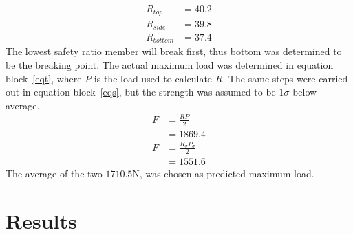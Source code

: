 \documentclass[12pt]{article}
\begin{document}
		\begin{subequations}
			\begin{align}
				R_{top}&=40.2\\
				R_{side}&=39.8\\
				R_{bottom}&=37.4
			\end{align}
			\label{eqrl}
		\end{subequations}
		The lowest safety ratio member will break first, thus bottom was determined to be the breaking point. The actual maximum load was determined in equation block~\ref{eqt}, where $P$ is the load used to calculate $R$. The same steps were carried out in equation block~\ref{eqs}, but the strength was assumed to be $1\sigma$ below average.
		\begin{subequations}
			\begin{align}
				F&=\frac{R P}{2} \\
				&=1869.4
			\end{align}
			\label{eqt}
		\end{subequations}
		\begin{subequations}
			\begin{align}
				F&=\frac{R_{\sigma} P_{\sigma}}{2} \\
				&=1551.6
			\end{align}
			\label{eqs}
		\end{subequations}
		The average of the two $1710.5\mathrm{N}$, was chosen as predicted maximum load.
	\section{Results}
	
\end{document}

